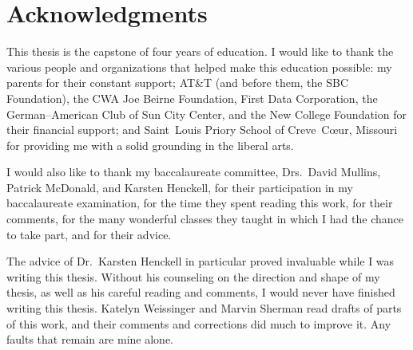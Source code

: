 
\bigskip

\begingroup
\let\clearpage\relax
\let\cleardoublepage\relax
\let\cleardoublepage\relax
\chapter*{Acknowledgments}
This thesis is the capstone of four years of education. I would like to thank the various people and organizations that helped make this education possible: my parents for their constant support; AT\&T (and before them, the SBC Foundation), the CWA Joe Beirne Foundation, First Data Corporation, the German--American Club of Sun City Center, and the New College Foundation for their financial support; and Saint~Louis Priory School of Creve~C\oe ur, Missouri for providing me with a solid grounding in the liberal arts.

I would also like to thank my baccalaureate committee, Drs.~David Mullins, Patrick McDonald, and Karsten Henckell, for their participation in my baccalaureate examination, for the time they spent reading this work, for their comments, for the many wonderful classes they taught in which I had the chance to take part, and for their advice.

The advice of Dr.~Karsten Henckell in particular proved invaluable while I was writing this thesis. Without his counseling on the direction and shape of my thesis, as well as his careful reading and comments, I would never have finished writing this thesis. Katelyn Weissinger and Marvin Sherman read drafts of parts of this work, and their comments and corrections did much to improve it. Any faults that remain are mine alone.
\endgroup



